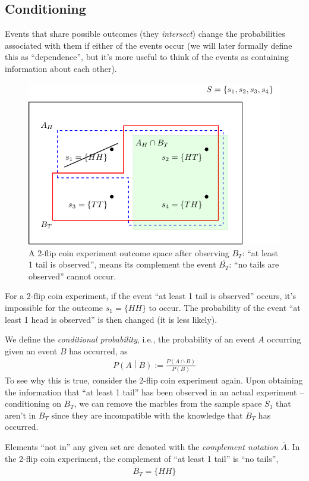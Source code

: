 \subsection{Conditioning}

Events that share possible outcomes (they \emph{intersect}) change the probabilities
associated with them if either of the events occur 
(we will later formally define this as ``dependence'', 
but it's more useful to think of the events as containing information about each other).

\begin{figure}[h!]
\centering
\includegraphics[width=0.6\linewidth]{tikz/figure2}
\caption{%
A 2-flip coin experiment outcome space after observing \(B_{T}\): ``at least 1 tail is observed'',
means its complement the event \(\overline{B_{T}}\): ``no tails are observed'' cannot occur.}
\label{fig:conditioning}
\end{figure}

For a 2-flip coin experiment, 
if the event ``at least 1 tail is observed'' occurs, 
it's impossible for the outcome \(s_{1} = \{HH\}\) to occur. 
The probability of the event ``at least 1 head is observed'' is then changed (it is less likely).

We define the \emph{conditional probability}, 
i.e., the probability of an event \(A\) occurring given an event \(B\) has occurred, as
\begin{align}
P\left( A \middle| B \right) := \frac{P(A \cap B)}{P(B)}
\end{align}
To see why this is true, 
consider the 2-flip coin experiment again. 
Upon obtaining the information that ``at least 1 tail'' has been observed in an actual experiment 
-- conditioning on \(B_{T}\), 
we can remove the marbles from the sample space \(S_{3}\) that aren't in \(B_{T}\) 
since they are incompatible with the knowledge that \(B_{T}\) has occurred.

Elements ``not in'' any given set are denoted with the \emph{complement notation} \(\overline{A}\). 
In the 2-flip coin experiment, 
the complement of ``at least 1 tail'' is ``no tails'',
\begin{align}
\overline{B_{T}} = \{ HH\}
\end{align}

